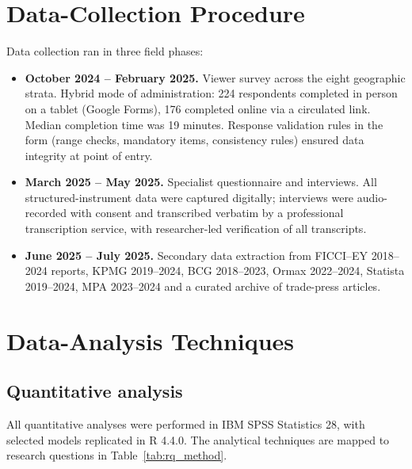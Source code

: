 \section{Data-Collection Procedure}
\label{sec:datacoll}

Data collection ran in three field phases:

\begin{itemize}[itemsep=2pt]
\item \textbf{October 2024 -- February 2025.}  Viewer survey
      across the eight geographic strata.  Hybrid mode of
      administration: 224 respondents completed in person on a
      tablet (Google Forms), 176 completed online via a circulated
      link.  Median completion time was 19 minutes.  Response
      validation rules in the form (range checks, mandatory items,
      consistency rules) ensured data integrity at point of entry.
\item \textbf{March 2025 -- May 2025.}  Specialist questionnaire
      and interviews.  All structured-instrument data were captured
      digitally; interviews were audio-recorded with consent and
      transcribed verbatim by a professional transcription
      service, with researcher-led verification of all
      transcripts.
\item \textbf{June 2025 -- July 2025.}  Secondary data extraction
      from FICCI--EY 2018--2024 reports, KPMG 2019--2024, BCG
      2018--2023, Ormax 2022--2024, Statista 2019--2024, MPA
      2023--2024 and a curated archive of trade-press articles.
\end{itemize}

\section{Data-Analysis Techniques}
\label{sec:analysis}

\subsection{Quantitative analysis}

All quantitative analyses were performed in IBM SPSS Statistics 28,
with selected models replicated in R 4.4.0.  The analytical
techniques are mapped to research questions in
Table~\ref{tab:rq_method}.

